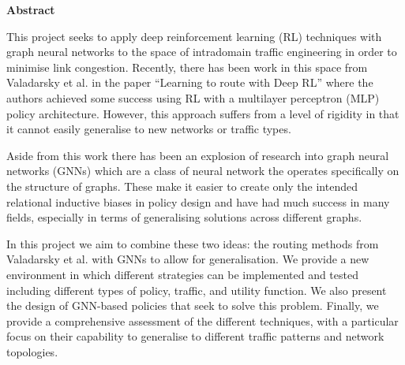 \newpage
{\Huge \bf Abstract}
\vspace{24pt} 

This project seeks to apply deep reinforcement learning (RL) techniques with graph neural networks to the space of intradomain traffic engineering in order to minimise link congestion. Recently, there has been work in this space from Valadarsky et al. in the paper ``Learning to route with Deep RL'' where the authors achieved some success using RL with a multilayer perceptron (MLP) policy architecture. However, this approach suffers from a level of rigidity in that it cannot easily generalise to new networks or traffic types.

Aside from this work there has been an explosion of research into graph neural networks (GNNs) which are a class of neural network the operates specifically on the structure of graphs. These make it easier to create only the intended relational inductive biases in policy design and have had much success in many fields, especially in terms of generalising solutions across different graphs.

In this project we aim to combine these two ideas: the routing methods from Valadarsky et al. with GNNs to allow for generalisation. We provide a new environment in which different strategies can be implemented and tested including different types of policy, traffic, and utility function. We also present the design of GNN-based policies that seek to solve this problem. Finally, we provide a comprehensive assessment of the different techniques, with a particular focus on their capability to generalise to different traffic patterns and network topologies.

\newpage
\vspace*{\fill}
